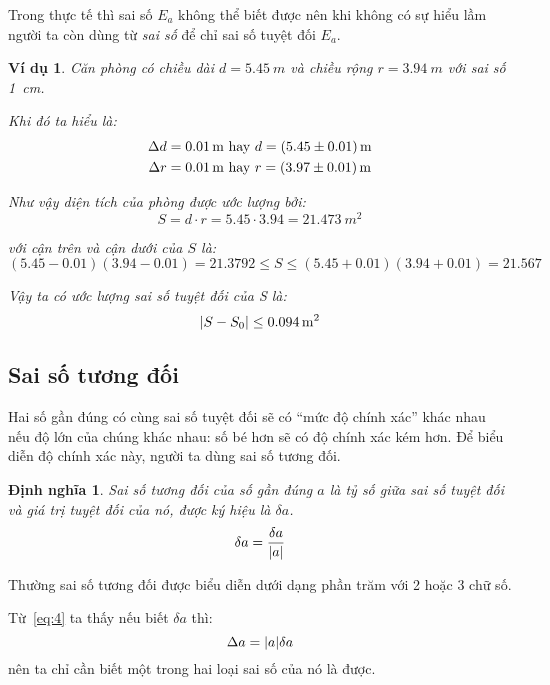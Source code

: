 \documentclass{book}
\newtheorem{definition}{Định nghĩa}
\newtheorem{exmp}{Ví dụ}[chapter]
\DeclarePairedDelimiter\abs{\lvert}{\rvert}%
\begin{document}
Trong thực tế thì sai số \(E_a\) không thể biết được nên khi không có sự hiểu
lầm người ta còn dùng từ \emph{sai số} để chỉ sai số tuyệt đối \(E_a\).

\begin{exmp}\label{exmp:room_example}
    Căn phòng có chiều dài \(d = \SI{5.45}{m}\) và chiều rộng \(r =
    \SI{3.94}{m}\) với sai số \SI{1}{cm}.

    Khi đó ta hiểu là:
    \begin{gather*}
        \Delta d = \SI{0.01}{m} \text{ hay } d = \SI[separate-uncertainty=true]{5.45 \pm 0.01}{m} \\
        \Delta r = \SI{0.01}{m} \text{ hay } r = \SI[separate-uncertainty=true]{3.97 \pm 0.01}{m}
    \end{gather*}

    Như vậy diện tích của phòng được ước lượng bởi:
    \[S = d \cdot r = \num{5.45} \cdot \num{3.94} = \SI{21.473}{m^2}\]

    với cận trên và cận dưới của \(S\) là:
    \[(\num{5.45} - \num{0.01})(\num{3.94} - \num{0.01}) = \num{21.3792} \leq S \leq (\num{5.45} + \num{0.01})(\num{3.94} + \num{0.01}) = \num{21.567}\]

    Vậy ta có ước lượng sai số tuyệt đối của S là:
    \[\abs{S - S_0} \leq \SI{0.094}{m^2}\]
\end{exmp}

\subsection{Sai số tương đối}

Hai số gần đúng có cùng sai số tuyệt đối sẽ có ``mức độ chính xác'' khác nhau nếu
độ lớn của chúng khác nhau: số bé hơn sẽ có độ chính xác kém hơn. Để biểu diễn
độ chính xác này, người ta dùng sai số tương đối.

\begin{definition}
    \emph{Sai số tương đối} của số gần đúng \(a\) là tỷ số giữa sai số tuyệt đối
    và giá trị tuyệt đối của nó, được ký hiệu là \(\delta a\).
    \begin{equation} \label{eq:4}
        \delta a = \frac{\delta a}{\abs{a}}
    \end{equation}
\end{definition}

Thường sai số tương đối được biểu diễn dưới dạng phần trăm với 2 hoặc 3 chữ số.

Từ~\ref{eq:4} ta thấy nếu biết \(\delta a\) thì:
\begin{equation} \label{eq:5}
    \Delta a = \abs{a}\delta a
\end{equation}
nên ta chỉ cần biết một trong hai loại sai số của nó là được.
\end{document}
